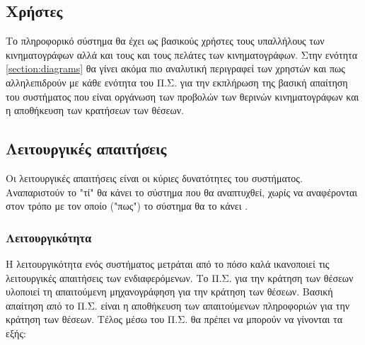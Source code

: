 \documentclass{assignment}
\begin{document}
\subsection{Χρήστες}

Το πληροφορικό σύστημα θα έχει ως βασικούς χρήστες τους υπαλλήλους των κινηματογράφων αλλά και τους και τους πελάτες των κινηματογράφων. Στην ενότητα \ref{section:diagrams} θα γίνει ακόμα πιο αναλυτική περιγραφεί των χρηστών και πως αλληλεπιδρούν με κάθε ενότητα του Π.Σ. για την εκπλήρωση της βασική απαίτηση του συστήματος που είναι οργάνωση των προβολών των θερινών κινηματογράφων και η αποθήκευση των κρατήσεων των θέσεων.


\subsection{Λειτουργικές απαιτήσεις}

Οι λειτουργικές απαιτήσεις είναι οι κύριες δυνατότητες του συστήματος. Αναπαριστούν το "τί" θα κάνει το σύστημα που θα αναπτυχθεί, χωρίς να αναφέρονται στον τρόπο με τον οποίο ("πως") το σύστημα θα το κάνει \cite{triadis}.

\subsubsection{Λειτουργικότητα}
Η λειτουργικότητα ενός συστήματος μετράται από το πόσο καλά ικανοποιεί τις λειτουργικές απαιτήσεις των ενδιαφερόμενων. Το Π.Σ. για την κράτηση των θέσεων υλοποιεί τη απαιτούμενη μηχανογράφηση για την κράτηση των θέσεων. Βασική απαίτηση από το Π.Σ. είναι η αποθήκευση των απαιτούμενων πληροφοριών για την κράτηση των θέσεων. Τέλος μέσω του Π.Σ. θα πρέπει να μπορούν να γίνονται τα εξής:
\end{document}
